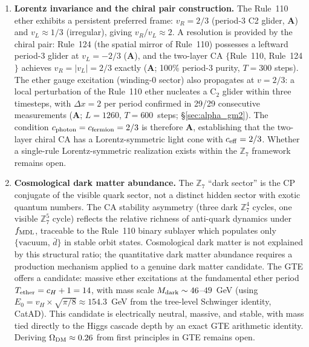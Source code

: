 \documentclass[11pt]{article}
\theoremstyle{remark}
\newcommand{\CatA}{\textbf{A}}
\begin{document}
\begin{enumerate}[leftmargin=1.5em]
\item \textbf{Lorentz invariance and the chiral pair construction.}
  The Rule~110 ether exhibits a persistent preferred frame: $v_R = 2/3$ (period-3
  C2 glider, $\CatA$) and $v_L \approx 1/3$ (irregular), giving $v_R/v_L \approx 2$.
  A resolution is provided by the chiral pair: Rule~124 (the spatial mirror
  of Rule~110) possesses a leftward period-3 glider at $v_L = -2/3$ ($\CatA$), and
  the two-layer CA $\{$Rule~110, Rule~124$\}$ achieves $v_R = |v_L| = 2/3$ exactly
  ($\CatA$; 100\% period-3 purity, $T=300$ steps).
  The ether gauge excitation (winding-0 sector) also propagates at $v = 2/3$:
  a local perturbation of the Rule~110 ether nucleates a C$_2$ glider within three
  timesteps, with $\Delta x = 2$ per period confirmed in 29/29 consecutive measurements
  ($\CatA$; $L = 1260$, $T = 600$~steps; \S\ref{sec:alpha_gm2}).
  The condition $c_{\rm photon} = c_{\rm fermion} = 2/3$ is therefore $\CatA$, establishing
  that the two-layer chiral CA has a Lorentz-symmetric light cone with $c_{\rm eff} = 2/3$.
  Whether a single-rule Lorentz-symmetric realization exists within the
  $\mathbb{Z}_7$ framework remains open.

\item \textbf{Cosmological dark matter abundance.}
  The $\mathbb{Z}_7$ ``dark sector'' is the CP conjugate of the visible quark
  sector, not a distinct hidden sector with exotic quantum numbers.
  The CA stability asymmetry (three dark $\mathbb{Z}_7^4$ cycles, one visible
  $\mathbb{Z}_7^5$ cycle) reflects the relative richness of anti-quark dynamics
  under $f_{\rm MDL}$, traceable to the Rule~110 binary sublayer which populates
  only $\{\text{vacuum},\,\bar{d}\}$ in stable orbit states.
  Cosmological dark matter is not explained by this structural ratio; the
  quantitative dark matter abundance requires a production mechanism applied to a
  genuine dark matter candidate.
  The GTE offers a candidate: massive ether excitations at the fundamental ether
  period $T_{\rm ether} = c_H + 1 = 14$, with mass scale
  $M_{\rm dark} \sim 46$--$49$~GeV (using $E_0 = v_H \times \sqrt{\pi/8}
  \approx 154.3$~GeV from the tree-level Schwinger identity, CatAD).
  This candidate is electrically neutral, massive, and stable, with mass tied
  directly to the Higgs cascade depth by an exact GTE arithmetic identity.
  Deriving $\Omega_{\rm DM} \approx 0.26$ from first principles in GTE
  remains open.
\end{enumerate}
\end{document}
